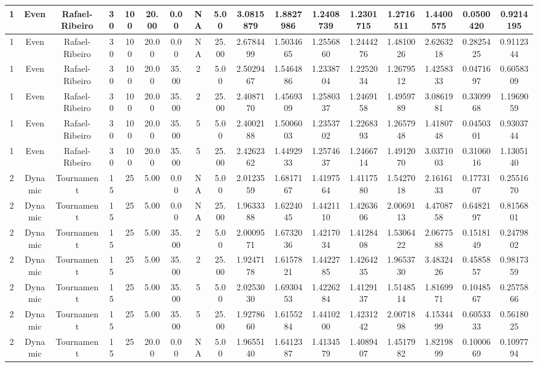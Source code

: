 \begin{longtable}{ | c | c | c | c | c | c | c | c | c | c | c | c | c | c | c | c | c | }
	\hline
	1	&	Even	&	Rafael-Ribeiro	&	30	&	100	&	20.00	&	0.00	&	NA	&	5.00	&	3.0815879	&	1.8827986	&	1.2408739	&	1.2301715	&	1.2716511	&	1.4400575	&	0.0500420	&	0.9214195 \\
	\hline
	1	&	Even	&	Rafael-Ribeiro	&	30	&	100	&	20.00	&	0.00	&	NA	&	25.00	&	2.6784499	&	1.5034665	&	1.2556860	&	1.2444276	&	1.4810026	&	2.6263218	&	0.2825425	&	0.9112344 \\
	\hline
	1	&	Even	&	Rafael-Ribeiro	&	30	&	100	&	20.00	&	35.00	&	2	&	5.00	&	2.5029467	&	1.5464886	&	1.2338704	&	1.2252034	&	1.2679512	&	1.4258333	&	0.0471697	&	0.6058309 \\
	\hline
	1	&	Even	&	Rafael-Ribeiro	&	30	&	100	&	20.00	&	35.00	&	2	&	25.00	&	2.4087170	&	1.4569309	&	1.2580337	&	1.2469158	&	1.4959789	&	3.0861981	&	0.3309968	&	1.1969059 \\
	\hline
	1	&	Even	&	Rafael-Ribeiro	&	30	&	100	&	20.00	&	35.00	&	5	&	5.00	&	2.4002188	&	1.5006003	&	1.2353702	&	1.2268393	&	1.2657948	&	1.4180748	&	0.0450301	&	0.9303744 \\
	\hline
	1	&	Even	&	Rafael-Ribeiro	&	30	&	100	&	20.00	&	35.00	&	5	&	25.00	&	2.4262362	&	1.4492933	&	1.2574637	&	1.2466714	&	1.4912070	&	3.0371003	&	0.3106016	&	1.1305140 \\
	\hline
	2	&	Dynamic	&	Tournament	&	15	&	25	&	5.00	&	0.00	&	NA	&	5.00	&	2.0123559	&	1.6817167	&	1.4197564	&	1.4117580	&	1.5427018	&	2.1616133	&	0.1773107	&	0.2551670 \\
	\hline
	2	&	Dynamic	&	Tournament	&	15	&	25	&	5.00	&	0.00	&	NA	&	25.00	&	1.9633388	&	1.6224045	&	1.4421110	&	1.4263606	&	2.0069113	&	4.4708758	&	0.6482197	&	0.8156801 \\
	\hline
	2	&	Dynamic	&	Tournament	&	15	&	25	&	5.00	&	35.00	&	2	&	5.00	&	2.0009571	&	1.6732036	&	1.4217034	&	1.4128408	&	1.5306422	&	2.0677588	&	0.1518149	&	0.2479802 \\
	\hline
	2	&	Dynamic	&	Tournament	&	15	&	25	&	5.00	&	35.00	&	2	&	25.00	&	1.9247178	&	1.6157821	&	1.4422785	&	1.4264235	&	1.9653730	&	3.4832426	&	0.4585857	&	0.9817359 \\
	\hline
	2	&	Dynamic	&	Tournament	&	15	&	25	&	5.00	&	35.00	&	5	&	5.00	&	2.0253030	&	1.6930453	&	1.4226284	&	1.4129137	&	1.5148514	&	1.8169971	&	0.1048567	&	0.2575866 \\
	\hline
	2	&	Dynamic	&	Tournament	&	15	&	25	&	5.00	&	35.00	&	5	&	25.00	&	1.9278660	&	1.6155284	&	1.4410200	&	1.4231242	&	2.0071898	&	4.1534499	&	0.6053333	&	0.5618025 \\
	\hline
	2	&	Dynamic	&	Tournament	&	15	&	25	&	20.00	&	0.00	&	NA	&	5.00	&	1.9655140	&	1.6412387	&	1.4134579	&	1.4089407	&	1.4517982	&	1.8219899	&	0.1000669	&	0.1097794 \\

\end{longtable}
